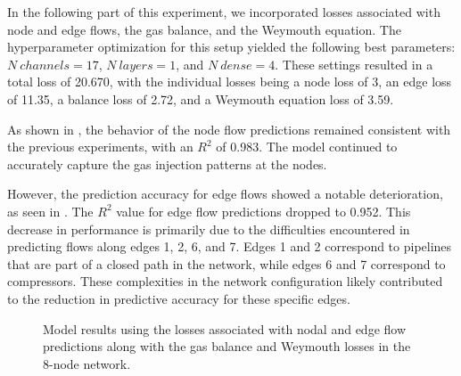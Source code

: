 In the following part of this experiment, we incorporated losses associated with node and edge flows, the gas balance, and the Weymouth equation. The hyperparameter optimization for this setup yielded the following best parameters: $N \ channels=17$, $N \ layers =1$, and $N \ dense =4$. These settings resulted in a total loss of 20.670, with the individual losses being a node loss of 3, an edge loss of 11.35, a balance loss of 2.72, and a Weymouth equation loss of 3.59.

As shown in , the behavior of the node flow predictions remained consistent with the previous experiments, with an $R^2$ of 0.983. The model continued to accurately capture the gas injection patterns at the nodes.

However, the prediction accuracy for edge flows showed a notable deterioration, as seen in . The $R^2$ value for edge flow predictions dropped to 0.952. This decrease in performance is primarily due to the difficulties encountered in predicting flows along edges 1, 2, 6, and 7. Edges 1 and 2 correspond to pipelines that are part of a closed path in the network, while edges 6 and 7 correspond to compressors. These complexities in the network configuration likely contributed to the reduction in predictive accuracy for these specific edges.

\begin{figure}[h]
    \centering
    \setlength{}        
    \setlength{} 
    
    \caption{Model results using the losses associated with nodal and edge flow predictions along with the gas balance and Weymouth losses in the 8-node network.}
    \label{fig:dummy_base_results}
\end{figure}

